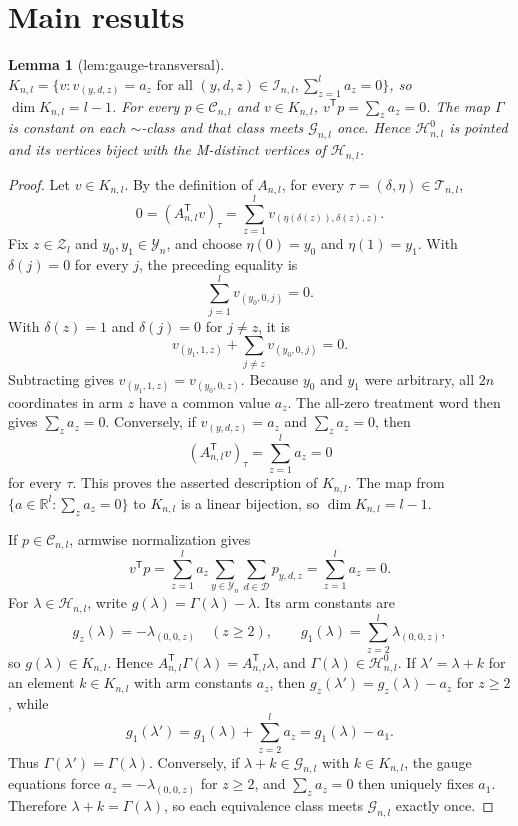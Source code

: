 \documentclass{article}
\newtheorem{lemma}{Lemma}
\begin{document}
\section{Main results}

\begin{lemma}[lem:gauge-transversal]\label{lem:gauge-transversal}
\(K_{n,l}=\{v:v_{(y,d,z)}=a_z\text{ for all }(y,d,z)\in\mathcal I_{n,l},\sum_{z=1}^l a_z=0\}\), so \(\dim K_{n,l}=l-1\). For every \(p\in\mathcal C_{n,l}\) and \(v\in K_{n,l}\), \(v^{\mathsf T}p=\sum_z a_z=0\). The map \(\Gamma\) is constant on each \(\sim\)-class and that class meets \(\mathcal G_{n,l}\) once. Hence \(\mathcal H^0_{n,l}\) is pointed and its vertices biject with the M-distinct vertices of \(\mathcal H_{n,l}\).
\end{lemma}
\begin{proof}
Let \(v\in K_{n,l}\). By the definition of \(A_{n,l}\), for every \(\tau=(\delta,\eta)\in\mathcal T_{n,l}\),
\[0=(A_{n,l}^{\mathsf T}v)_\tau=\sum_{z=1}^l v_{(\eta(\delta(z)),\delta(z),z)}.\]
Fix \(z\in\mathcal Z_l\) and \(y_0,y_1\in\mathcal Y_n\), and choose \(\eta(0)=y_0\) and \(\eta(1)=y_1\). With \(\delta(j)=0\) for every \(j\), the preceding equality is
\[\sum_{j=1}^l v_{(y_0,0,j)}=0.\]
With \(\delta(z)=1\) and \(\delta(j)=0\) for \(j\ne z\), it is
\[v_{(y_1,1,z)}+\sum_{j\ne z}v_{(y_0,0,j)}=0.\]
Subtracting gives \(v_{(y_1,1,z)}=v_{(y_0,0,z)}\). Because \(y_0\) and \(y_1\) were arbitrary, all \(2n\) coordinates in arm \(z\) have a common value \(a_z\). The all-zero treatment word then gives \(\sum_z a_z=0\). Conversely, if \(v_{(y,d,z)}=a_z\) and \(\sum_z a_z=0\), then
\[(A_{n,l}^{\mathsf T}v)_\tau=\sum_{z=1}^l a_z=0\]
for every \(\tau\). This proves the asserted description of \(K_{n,l}\). The map from \(\{a\in\mathbb R^l:\sum_z a_z=0\}\) to \(K_{n,l}\) is a linear bijection, so \(\dim K_{n,l}=l-1\).

If \(p\in\mathcal C_{n,l}\), armwise normalization gives
\[v^{\mathsf T}p=\sum_{z=1}^l a_z\sum_{y\in\mathcal Y_n}\sum_{d\in\mathcal D}p_{y,d,z}=\sum_{z=1}^l a_z=0.\]
For \(\lambda\in\mathcal H_{n,l}\), write \(g(\lambda)=\Gamma(\lambda)-\lambda\). Its arm constants are
\[g_z(\lambda)=-\lambda_{(0,0,z)}\quad(z\ge2),\qquad g_1(\lambda)=\sum_{z=2}^l\lambda_{(0,0,z)},\]
so \(g(\lambda)\in K_{n,l}\). Hence \(A_{n,l}^{\mathsf T}\Gamma(\lambda)=A_{n,l}^{\mathsf T}\lambda\), and \(\Gamma(\lambda)\in\mathcal H^0_{n,l}\). If \(\lambda'=\lambda+k\) for an element \(k\in K_{n,l}\) with arm constants \(a_z\), then \(g_z(\lambda')=g_z(\lambda)-a_z\) for \(z\ge2\), while
\[g_1(\lambda')=g_1(\lambda)+\sum_{z=2}^l a_z=g_1(\lambda)-a_1.\]
Thus \(\Gamma(\lambda')=\Gamma(\lambda)\). Conversely, if \(\lambda+k\in\mathcal G_{n,l}\) with \(k\in K_{n,l}\), the gauge equations force \(a_z=-\lambda_{(0,0,z)}\) for \(z\ge2\), and \(\sum_z a_z=0\) then uniquely fixes \(a_1\). Therefore \(\lambda+k=\Gamma(\lambda)\), so each equivalence class meets \(\mathcal G_{n,l}\) exactly once.


\end{proof}
\end{document}
